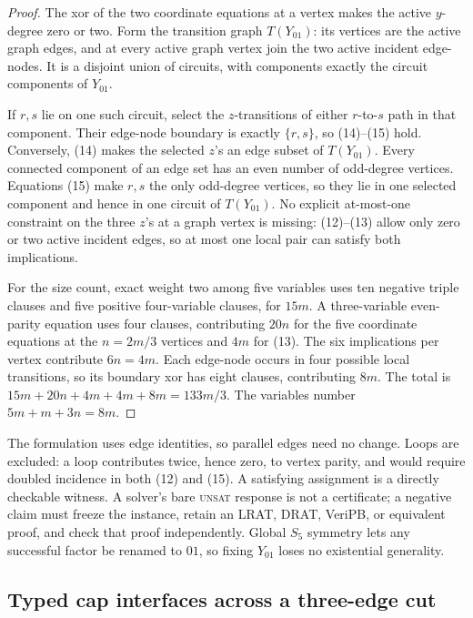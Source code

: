 \documentclass[11pt]{article}
\theoremstyle{definition}
\theoremstyle{remark}
\begin{document}
\begin{proof}
The xor of the two coordinate equations at a vertex makes the active
\(y\)-degree zero or two.  Form the transition graph \(T(Y_{01})\): its
vertices are the active graph edges, and at every active graph vertex join
the two active incident edge-nodes.  It is a disjoint union of circuits,
with components exactly the circuit components of \(Y_{01}\).

If \(r,s\) lie on one such circuit, select the \(z\)-transitions of either
\(r\)-to-\(s\) path in that component.  Their edge-node boundary is exactly
\(\{r,s\}\), so (14)--(15) hold.  Conversely, (14) makes the selected
\(z\)'s an edge subset of \(T(Y_{01})\).  Every connected component of an
edge set has an even number of odd-degree vertices.  Equations (15) make
\(r,s\) the only odd-degree vertices, so they lie in one selected component
and hence in one circuit of \(T(Y_{01})\).  No explicit at-most-one
constraint on the three \(z\)'s at a graph vertex is missing: (12)--(13)
allow only zero or two active incident edges, so at most one local pair can
satisfy both implications.

For the size count, exact weight two among five variables uses ten negative
triple clauses and five positive four-variable clauses, for \(15m\).
A three-variable even-parity equation uses four clauses, contributing
\(20n\) for the five coordinate equations at the \(n=2m/3\) vertices and
\(4m\) for (13).  The six implications per vertex contribute
\(6n=4m\).  Each edge-node occurs in four possible local transitions, so
its boundary xor has eight clauses, contributing \(8m\).  The total is
\(15m+20n+4m+4m+8m=133m/3\).  The variables number
\(5m+m+3n=8m\).
\end{proof}

The formulation uses edge identities, so parallel edges need no change.
Loops are excluded: a loop contributes twice, hence zero, to vertex parity,
and would require doubled incidence in both (12) and (15).  A satisfying
assignment is a directly checkable witness.  A solver's bare
\textsc{unsat} response is not a certificate; a negative claim must freeze
the instance, retain an LRAT, DRAT, VeriPB, or equivalent proof, and check
that proof independently.  Global \(S_5\) symmetry lets any successful
factor be renamed to \(01\), so fixing \(Y_{01}\) loses no existential
generality.

\subsection{Typed cap interfaces across a three-edge cut}
\end{document}
